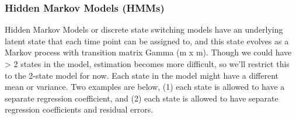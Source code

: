 \documentclass[]{article}
\begin{document}
\hypertarget{hidden-markov-models-hmms}{%
\subsubsection{Hidden Markov Models
(HMMs)}\label{hidden-markov-models-hmms}}

Hidden Markov Models or discrete state switching models have an
underlying latent state that each time point can be assigned to, and
this state evolves as a Markov process with transition matrix Gamma (m x
m). Though we could have \textgreater{} 2 states in the model,
estimation becomes more difficult, so we'll restrict this to the 2-state
model for now. Each state in the model might have a different mean or
variance. Two examples are below, (1) each state is allowed to have a
separate regression coefficient, and (2) each state is allowed to have
separate regression coefficients and residual errors.
\end{document}
